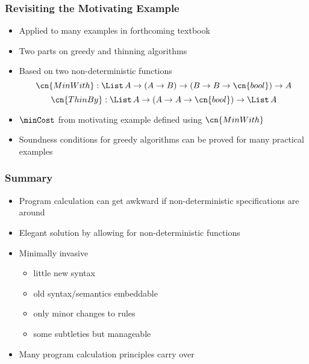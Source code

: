 \documentclass{beamer}
\def\prop{\cn{bool}}
\begin{document}
\begin{frame}\frametitle{Revisiting the Motivating Example}
\begin{itemize}
\item Applied to many examples in forthcoming textbook
\item Two parts on greedy and thinning algorithms
\item Based on two non-deterministic functions
 \[\cn{MinWith}:\List\,A\to(A\to B)\to (B\to B\to\prop)\to A\]
 \[\cn{ThinBy}:\List\,A\to(A\to A\to\prop)\to \List\,A\]
\item $\minCost$ from motivating example defined using $\cn{MinWith}$
\item Soundness conditions for greedy algorithms can be proved for many practical examples
\end{itemize}
\end{frame}


\begin{frame}\frametitle{Summary}
\begin{itemize}
\item Program calculation can get awkward if non-deterministic specifications are around
\item Elegant solution by allowing for non-deterministic functions
\item Minimally invasive
 \begin{itemize}
 \item little new syntax
 \item old syntax/semantics embeddable
 \item only minor changes to rules 
 \item some subtleties but manageable
 \end{itemize}
\item Many program calculation principles carry over
\end{itemize}
\end{frame}
\end{document}
